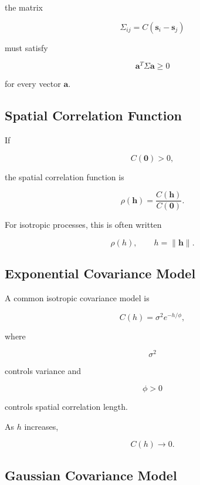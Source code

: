the matrix

\[
\boxed{
\Sigma_{ij}
=
C
(
\mathbf{s}_i-\mathbf{s}_j
)
}
\]

must satisfy

\[
\boxed{
\mathbf{a}^T
\Sigma
\mathbf{a}
\geq0
}
\]

for every vector \(\mathbf{a}\).

\subsection{Spatial Correlation Function}
\label{subsec:spatial-correlation-function}

If

\[
C(\mathbf{0})>0,
\]

the spatial correlation function is

\[
\boxed{
\rho(\mathbf{h})
=
\frac{
C(\mathbf{h})
}{
C(\mathbf{0})
}.
}
\]

For isotropic processes, this is often written

\[
\boxed{
\rho(h),
\qquad
h=\|\mathbf{h}\|.
}
\]

\subsection{Exponential Covariance Model}
\label{subsec:exponential-spatial-covariance}

A common isotropic covariance model is

\[
\boxed{
C(h)
=
\sigma^2
e^{-h/\phi},
}
\]

where

\[
\sigma^2
\]

controls variance and

\[
\phi>0
\]

controls spatial correlation length.

As \(h\) increases,

\[
C(h)
\to0.
\]

\subsection{Gaussian Covariance Model}
\label{subsec:gaussian-spatial-covariance}

